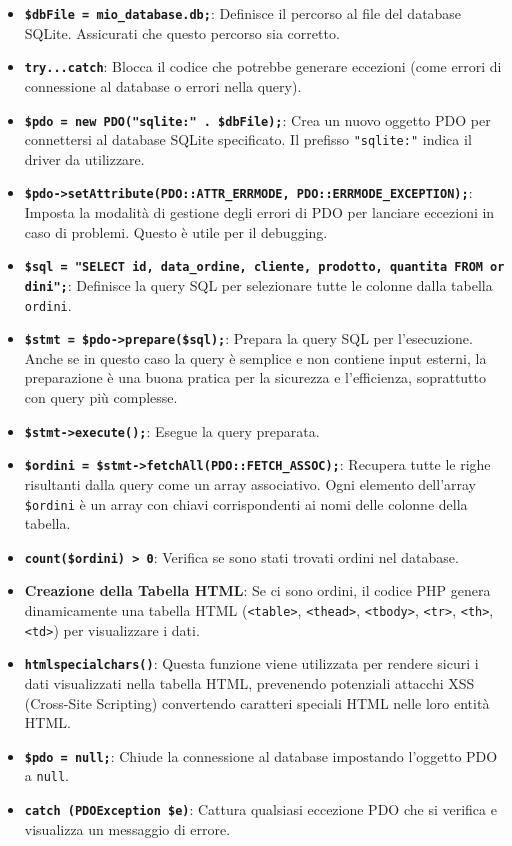 \documentclass[
]{article}
\providecommand{\tightlist}{%
  \setlength{\itemsep}{0pt}\setlength{\parskip}{0pt}}
\begin{document}
\begin{itemize}
\tightlist
\item
  \textbf{\texttt{\$dbFile\ =\ \textquotesingle{}mio\_database.db\textquotesingle{};}}:
  Definisce il percorso al file del database SQLite. Assicurati che
  questo percorso sia corretto.
\item
  \textbf{\texttt{try...catch}}: Blocca il codice che potrebbe generare
  eccezioni (come errori di connessione al database o errori nella
  query).
\item
  \textbf{\texttt{\$pdo\ =\ new\ PDO("sqlite:"\ .\ \$dbFile);}}: Crea un
  nuovo oggetto PDO per connettersi al database SQLite specificato. Il
  prefisso \texttt{"sqlite:"} indica il driver da utilizzare.
\item
  \textbf{\texttt{\$pdo-\textgreater{}setAttribute(PDO::ATTR\_ERRMODE,\ PDO::ERRMODE\_EXCEPTION);}}:
  Imposta la modalità di gestione degli errori di PDO per lanciare
  eccezioni in caso di problemi. Questo è utile per il debugging.
\item
  \textbf{\texttt{\$sql\ =\ "SELECT\ id,\ data\_ordine,\ cliente,\ prodotto,\ quantita\ FROM\ ordini";}}:
  Definisce la query SQL per selezionare tutte le colonne dalla tabella
  \texttt{ordini}.
\item
  \textbf{\texttt{\$stmt\ =\ \$pdo-\textgreater{}prepare(\$sql);}}:
  Prepara la query SQL per l'esecuzione. Anche se in questo caso la
  query è semplice e non contiene input esterni, la preparazione è una
  buona pratica per la sicurezza e l'efficienza, soprattutto con query
  più complesse.
\item
  \textbf{\texttt{\$stmt-\textgreater{}execute();}}: Esegue la query
  preparata.
\item
  \textbf{\texttt{\$ordini\ =\ \$stmt-\textgreater{}fetchAll(PDO::FETCH\_ASSOC);}}:
  Recupera tutte le righe risultanti dalla query come un array
  associativo. Ogni elemento dell'array \texttt{\$ordini} è un array con
  chiavi corrispondenti ai nomi delle colonne della tabella.
\item
  \textbf{\texttt{count(\$ordini)\ \textgreater{}\ 0}}: Verifica se sono
  stati trovati ordini nel database.
\item
  \textbf{Creazione della Tabella HTML}: Se ci sono ordini, il codice
  PHP genera dinamicamente una tabella HTML
  (\texttt{\textless{}table\textgreater{}},
  \texttt{\textless{}thead\textgreater{}},
  \texttt{\textless{}tbody\textgreater{}},
  \texttt{\textless{}tr\textgreater{}},
  \texttt{\textless{}th\textgreater{}},
  \texttt{\textless{}td\textgreater{}}) per visualizzare i dati.
\item
  \textbf{\texttt{htmlspecialchars()}}: Questa funzione viene utilizzata
  per rendere sicuri i dati visualizzati nella tabella HTML, prevenendo
  potenziali attacchi XSS (Cross-Site Scripting) convertendo caratteri
  speciali HTML nelle loro entità HTML.
\item
  \textbf{\texttt{\$pdo\ =\ null;}}: Chiude la connessione al database
  impostando l'oggetto PDO a \texttt{null}.
\item
  \textbf{\texttt{catch\ (PDOException\ \$e)}}: Cattura qualsiasi
  eccezione PDO che si verifica e visualizza un messaggio di errore.
\end{itemize}
\end{document}

